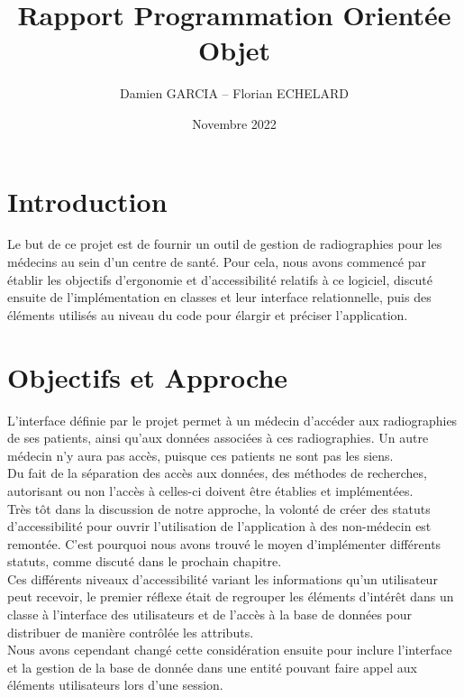 \documentclass[12pt,a4paper]{article}
\begin{document}
\title{Rapport Programmation Orientée Objet}
\author{Damien GARCIA -- Florian ECHELARD}
\date{Novembre 2022}
\maketitle

\begin{multicols}{2}

\section{Introduction}	
Le but de ce projet est de fournir un outil de gestion de radiographies pour les médecins au sein d'un centre de santé. Pour cela, nous avons commencé par établir les objectifs d'ergonomie et d'accessibilité relatifs à ce logiciel, discuté ensuite de l'implémentation en classes et leur interface relationnelle, puis des éléments utilisés au niveau du code pour élargir et préciser l'application.

\section{Objectifs et Approche}
L'interface définie par le projet permet à un médecin d'accéder aux radiographies de ses patients, ainsi qu'aux données associées à ces radiographies. Un autre médecin n'y aura pas accès, puisque ces patients ne sont pas les siens. \\
		
Du fait de la séparation des accès aux données, des méthodes de recherches, autorisant ou non l'accès à celles-ci doivent être établies et implémentées. \\
		
Très tôt dans la discussion de notre approche, la volonté de créer des statuts d'accessibilité pour ouvrir l'utilisation de l'application à des non-médecin est remontée. C'est pourquoi nous avons trouvé le moyen d'implémenter différents statuts, comme discuté dans le prochain chapitre. \\
		
Ces différents niveaux d'accessibilité variant les informations qu'un utilisateur peut recevoir, le premier réflexe était de regrouper les éléments d'intérêt dans un classe à l'interface des utilisateurs et de l'accès à la base de données pour distribuer de manière contrôlée les attributs. \\
		
Nous avons cependant changé cette considération ensuite pour inclure l'interface et la gestion de la base de donnée dans une entité pouvant faire appel aux éléments utilisateurs lors d'une session. \\
		

\end{multicols}
\end{document}
